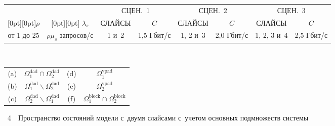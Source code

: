 \begin{multicols}{2}
\begin{table*}
\begin{center}
\begin{tabular}{|c|c|c|c|c|c|c|c|}
\hline
  &  & \multicolumn{2}{c|}{СЦЕН.\ 1} & \multicolumn{2}{c|}{СЦЕН.\ 2} & 
\multicolumn{2}{c|}{СЦЕН.\ 3} \\ 
\cline{3-8}
\multicolumn{1}{|c|}{\raisebox{6pt}[0pt][0pt]{$\rho$}} &
\multicolumn{1}{c|}{\raisebox{6pt}[0pt][0pt]{ $\lambda_s$}} & СЛАЙСЫ & $C$ & СЛАЙСЫ  & $C$ & СЛАЙСЫ  & $C$ \\ 
\hline
от 1 до 25 & $\rho\mu_s$ запросов/с & 1 и~2 & 1,5 Гбит/с & 1, 2 и~3 & 2,0 Гбит/с & 1, 2, 3 и~4 & 2,5 Гбит/с \\
\hline
\end{tabular}
\end{center}
\end{table*}









{ \begin{center}  %
 \vspace*{6pt}
   \mbox{%
\epsfxsize=76.222mm
}


\vspace*{12pt}

{\small \begin{tabular}{|c|c|c|c|}
\hline
(a) & $\Omega_1^{\mathrm{dad}}\cap \Omega_2^{\mathrm{dad}}$ & (d) & $\Omega_1^{\mathrm{vpad}}$\\
(b) & $\Omega_1^{\mathrm{dad}}\backslash \Omega_2^{\mathrm{dad}}$ & (e) & $\Omega_2^{\mathrm{vpad}}$\\
(c) & $\Omega_2^{\mathrm{dad}}\backslash \Omega_1^{\mathrm{dad}}$ & (f) & $\Omega_1^{\mathrm{block}}\cap \Omega_2^{\mathrm{block}}$\\
\hline
\end{tabular}}
\end{center}


\noindent
{{\figurename~4}\ \ \small{Пространство состояний модели с~двумя слайсами с~учетом основных подмножеств системы
}}}

\vspace*{9pt}

\addtocounter{figure}{1}

\pagebreak





\end{multicols}
